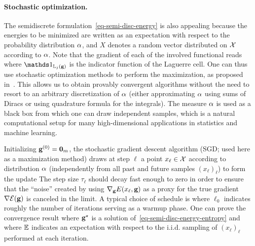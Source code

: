 \paragraph{Stochastic optimization.}

The semidiscrete formulation~\eqref{eq-semi-disc-energy} is also appealing because the energies to be minimized are written as an expectation with respect to the probability distribution $\alpha$,
and $X$ denotes a random vector distributed on $\mathcal{X}$ according to $\alpha$.
%
Note that the gradient of each of the involved functional reads
where $\ones_{\Laguerre_{j}(\gD)}$ is the indicator function of the Laguerre cell. 
%
One can thus use stochastic optimization methods to perform the maximization, as proposed in~\cite{genevay2016stochastic}.
%
This allows us to obtain provably convergent algorithms without the need to resort to an arbitrary discretization of $\alpha$ (either approximating $\alpha$ using sums of Diracs or using quadrature formula for the integrals).
%
The measure $\alpha$ is used as a black box from which one can draw independent samples, which is a natural computational setup for many high-dimensional applications in statistics and machine learning. 

Initializing $\mathrm{\textbf{\upshape g}}^{(0)} = \textbf{0}_{m}$, the stochastic gradient descent algorithm (SGD; used here as a maximization method) draws at step $\ell$ a point $x_\ell \in \mathcal{X}$ according to distribution $\alpha$ (independently from all past and future samples $(x_\ell)_\ell$) to form the update
The step size $\tau_\ell$ should decay fast enough to zero in order to ensure that the ``noise'' created by using  $\nabla_{\mathrm{\textbf{\upshape g}}} E(x_\ell,\mathrm{\textbf{\upshape g}})$ as a proxy for the true gradient $\nabla \mathcal{E}(\mathrm{\textbf{\upshape g}})$ is canceled in the limit. 
%
A typical choice of schedule is 
where $\ell_0$ indicates roughly the number of iterations serving as a warmup phase.
%
One can prove the convergence result
where $\mathrm{\textbf{\upshape g}}^\star$ is a solution of~\eqref{eq-semi-disc-energy-entropy} and where $\mathbb{E}$ indicates an expectation with respect to the i.i.d. sampling of $(x_\ell)_\ell$ performed at each iteration.
%


